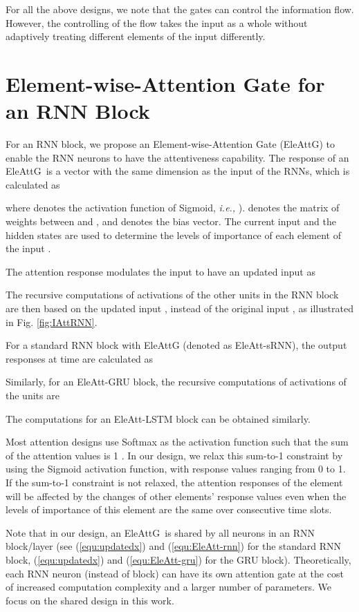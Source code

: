 \documentclass[runningheads]{llncs}
\newcommand{\Outer}{Element-wise}
\newcommand{\EleAttGn}{{EleAttG}}
\newcommand{\EleAttG}{{EleAttG~}}
\begin{document}
{	

	For all the above designs, we note that the gates can control the information flow. However, the controlling of the flow takes the input  as a whole without adaptively treating different elements of the input differently. 

	\section{\Outer-Attention Gate for an RNN Block}
	\label{sec:EleAtt-RNN}

	For an RNN block, we propose an \Outer-Attention Gate (\EleAttGn) to enable the RNN neurons to have the attentiveness capability. The response of an \EleAttG is a vector  with the same dimension as the input  of the RNNs, which is calculated as 
	
	where  denotes the activation function of Sigmoid, {\it i.e.,} ).  denotes the matrix of weights between  and , and  denotes the bias vector. The current input  and the hidden states  are used to determine the levels of importance of each element of the input .
	
	The attention response modulates the input to have an updated input  as 
	
	The recursive computations of activations of the other units in the RNN block are then based on the updated input , instead of the original input , as illustrated in Fig. \ref{fig:IAttRNN}.
	
	For a standard RNN block with EleAttG (denoted as EleAtt-sRNN), the output responses  at time  are calculated as
	
	
	Similarly, for an EleAtt-GRU block, the recursive computations of activations of the units are
	
	
	The computations for an EleAtt-LSTM block can be obtained similarly.


	Most attention designs use Softmax as the activation function such that the sum of the attention values is 1 \cite{luong2015effective,vaswani2017attention,xu2015show,li2017attentive,sharma2015actionattention,wang2016hierarchical,song2017end}. In our design, we relax this sum-to-1 constraint by using the Sigmoid activation function, with response values ranging from 0 to 1. If the sum-to-1 constraint is not relaxed, the attention responses of the  element will be affected by the changes of other elements' response values even when the levels of importance of this element are the same over consecutive time slots. 


	
	Note that in our design, an \EleAttG is shared by all neurons in an RNN block/layer (see (\ref{equ:updatedx}) and (\ref{equ:EleAtt-rnn}) for the standard RNN block, (\ref{equ:updatedx}) and (\ref{equ:EleAtt-gru}) for the GRU block). Theoretically, each RNN neuron (instead of block) can have its own attention gate at the cost of increased computation complexity and a larger number of parameters. We focus on the shared design in this work.}
\end{document}
